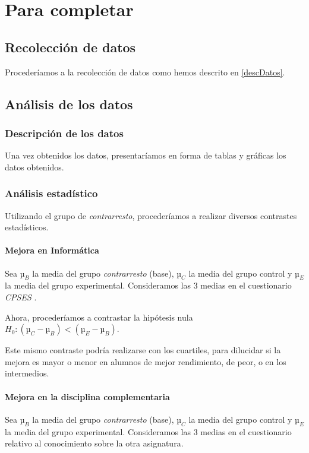 \documentclass[palatino,miniheader]{apuntesURJC}
\newcommand{\CPSES}{\textit{\gls{CPSES}} \cite{CPSES}}
\begin{document}
\chapter{Para completar}
\section{Recolección de datos}

Procederíamos a la recolección de datos como hemos descrito en \ref{descDatos}.

\section{Análisis de los datos}

\subsection{Descripción de los datos}

Una vez obtenidos los datos, presentaríamos en forma de tablas y gráficas los datos obtenidos.

\subsection{Análisis estadístico}

Utilizando el grupo de \textit{contrarresto}, procederíamos a realizar diversos contrastes estadísticos.


\subsubsection{Mejora en Informática}

Sea $µ_B$ la media del grupo \textit{contrarresto} (base), $µ_C$ la media del grupo control y $µ_E$ la media del grupo experimental.
%
Consideramos las 3 medias en el cuestionario \CPSES.

Ahora, procederíamos a contrastar la hipótesis nula $H_0: (µ_C - µ_B) < (µ_E - µ_B)$.

Este mismo contraste podría realizarse con los cuartiles, para dilucidar si la mejora es mayor o menor en alumnos de mejor rendimiento, de peor, o en los intermedios.

\subsubsection{Mejora en la disciplina complementaria}

Sea $µ_B$ la media del grupo \textit{contrarresto} (base), $µ_C$ la media del grupo control y $µ_E$ la media del grupo experimental.
%
Consideramos las 3 medias en el cuestionario relativo al conocimiento sobre la otra asignatura.
\end{document}
